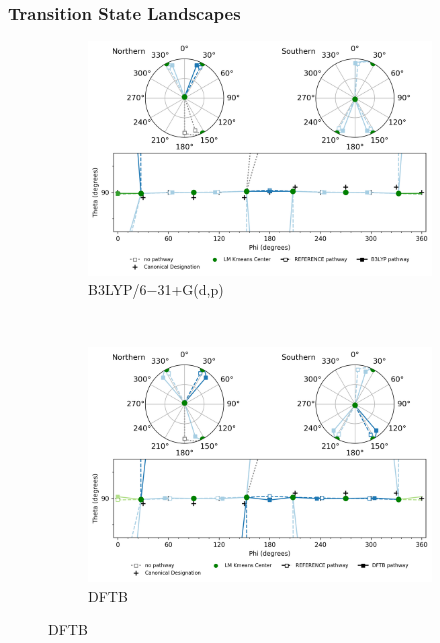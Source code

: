 \documentclass{article}
\begin{document}
\subsubsection{Transition State Landscapes}
\begin{figure}[H]
	\centering
	\begin{subfigure}[b]{0.48\textwidth}
		\includegraphics[width=1\textwidth,keepaspectratio]
		{figures/oxane/all_groups/z_dataset-oxane-TS--all_groups_comp-B3LYP.png}
		\caption{B3LYP/6$-$31+G(d,p)}
	\end{subfigure}
	~
	\begin{subfigure}[b]{0.48\textwidth}
		\includegraphics[width=1\textwidth,keepaspectratio]
		{figures/oxane/all_groups/z_dataset-oxane-TS--all_groups_comp-DFTB.png}
		\caption{DFTB}
	\end{subfigure}
\end{figure}
\end{document}
